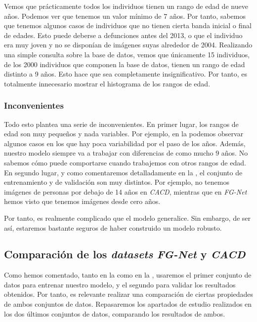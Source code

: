 Vemos que prácticamente todos los individuos tienen un rango de edad de nueve años. Podemos ver que tenemos un valor mínimo de 7 años. Por tanto, sabemos que tenemos algunos casos de individuos que no tienen cierta banda inicial o final de edades. Esto puede deberse a defunciones antes del 2013, o que el individuo era muy joven y no se disponían de imágenes suyas alrededor de 2004. Realizando una simple consulta sobre la base de datos, vemos que únicamente 15 individuos, de los 2000 individuos que componen la base de datos, tienen un rango de edad distinto a 9 años. Esto hace que sea completamente insignificativo. Por tanto, es totalmente innecesario mostrar el histograma de los rangos de edad.

\subsubsection{Inconvenientes}

Todo esto plantea una serie de inconvenientes. En primer lugar, los rangos de edad son muy pequeños y nada variables. Por ejemplo, en la  podemos observar algunos casos en los que hay poca variabilidad por el paso de los años. Además, nuestro modelo siempre va a trabajar con diferencias de como mucho 9 años. No sabemos cómo puede comportarse cuando trabajemos con otros rangos de edad. En segundo lugar, y como comentaremos detalladamente en la , el conjunto de entrenamiento y de validación son muy distintos. Por ejemplo, no tenemos imágenes de personas por debajo de 14 años en \textit{CACD}, mientras que en \textit{FG-Net} hemos visto que tenemos imágenes desde cero años.

Por tanto, es realmente complicado que el modelo generalice. Sin embargo, de ser así, estaremos bastante seguros de haber construido un modelo robusto.

\subsection{Comparación de los \textit{datasets} \textit{FG-Net} y \textit{CACD}} \label{isec:comparaciones_datasets}

Como hemos comentado, tanto en la  como en la , usaremos el primer conjunto de datos para entrenar nuestro modelo, y el segundo para validar los resultados obtenidos. Por tanto, es relevante realizar una comparación de ciertas propiedades de ambos conjuntos de datos. Repasaremos los apartados de estudio realizados en los dos últimos conjuntos de datos, comparando los resultados de ambos.

